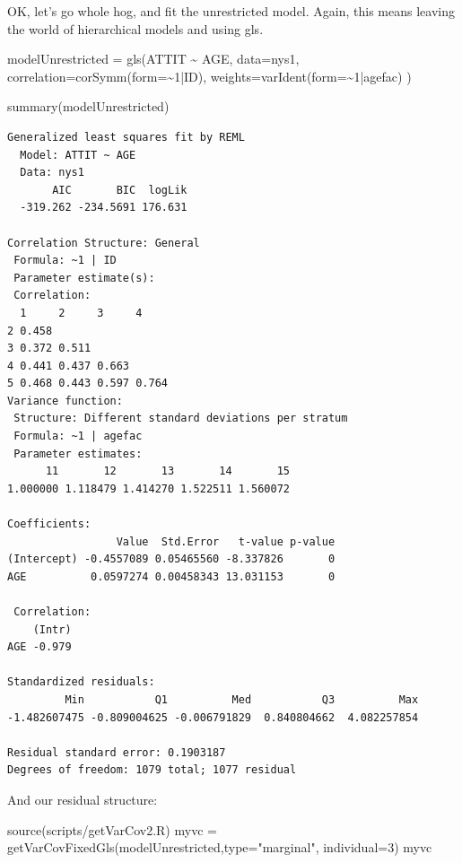 \documentclass[
  letterpaper,
  DIV=11,
  numbers=noendperiod]{scrreprt}
\newenvironment{Shaded}{\begin{snugshade}}{\end{snugshade}}
\newcommand{\AttributeTok}[1]{\textcolor[rgb]{0.49,0.56,0.16}{#1}}
\newcommand{\DecValTok}[1]{\textcolor[rgb]{0.25,0.63,0.44}{#1}}
\newcommand{\FunctionTok}[1]{\textcolor[rgb]{0.02,0.16,0.49}{#1}}
\newcommand{\NormalTok}[1]{\textcolor[rgb]{0.00,0.44,0.13}{#1}}
\newcommand{\OtherTok}[1]{\textcolor[rgb]{0.00,0.44,0.13}{#1}}
\newcommand{\SpecialCharTok}[1]{\textcolor[rgb]{0.25,0.44,0.63}{#1}}
\newcommand{\StringTok}[1]{\textcolor[rgb]{0.25,0.44,0.63}{#1}}
\begin{document}
OK, let's go whole hog, and fit the unrestricted model. Again, this
means leaving the world of hierarchical models and using gls.

\begin{Shaded}
\begin{Highlighting}[]
\NormalTok{modelUnrestricted }\OtherTok{=} \FunctionTok{gls}\NormalTok{(ATTIT }\SpecialCharTok{\textasciitilde{}}\NormalTok{ AGE, }
               \AttributeTok{data=}\NormalTok{nys1,}
               \AttributeTok{correlation=}\FunctionTok{corSymm}\NormalTok{(}\AttributeTok{form=}\SpecialCharTok{\textasciitilde{}}\DecValTok{1}\SpecialCharTok{|}\NormalTok{ID),}
               \AttributeTok{weights=}\FunctionTok{varIdent}\NormalTok{(}\AttributeTok{form=}\SpecialCharTok{\textasciitilde{}}\DecValTok{1}\SpecialCharTok{|}\NormalTok{agefac) )}


\FunctionTok{summary}\NormalTok{(modelUnrestricted)}
\end{Highlighting}
\end{Shaded}

\begin{verbatim}
Generalized least squares fit by REML
  Model: ATTIT ~ AGE 
  Data: nys1 
       AIC       BIC  logLik
  -319.262 -234.5691 176.631

Correlation Structure: General
 Formula: ~1 | ID 
 Parameter estimate(s):
 Correlation: 
  1     2     3     4    
2 0.458                  
3 0.372 0.511            
4 0.441 0.437 0.663      
5 0.468 0.443 0.597 0.764
Variance function:
 Structure: Different standard deviations per stratum
 Formula: ~1 | agefac 
 Parameter estimates:
      11       12       13       14       15 
1.000000 1.118479 1.414270 1.522511 1.560072 

Coefficients:
                 Value  Std.Error   t-value p-value
(Intercept) -0.4557089 0.05465560 -8.337826       0
AGE          0.0597274 0.00458343 13.031153       0

 Correlation: 
    (Intr)
AGE -0.979

Standardized residuals:
         Min           Q1          Med           Q3          Max 
-1.482607475 -0.809004625 -0.006791829  0.840804662  4.082257854 

Residual standard error: 0.1903187 
Degrees of freedom: 1079 total; 1077 residual
\end{verbatim}

And our residual structure:

\begin{Shaded}
\begin{Highlighting}[]
\FunctionTok{source}\NormalTok{(}\StringTok{\textquotesingle{}scripts/getVarCov2.R\textquotesingle{}}\NormalTok{)}
\NormalTok{myvc }\OtherTok{=} \FunctionTok{getVarCovFixedGls}\NormalTok{(modelUnrestricted,}\AttributeTok{type=}\StringTok{"marginal"}\NormalTok{, }\AttributeTok{individual=}\DecValTok{3}\NormalTok{)}
\NormalTok{myvc}
\end{Highlighting}
\end{Shaded}
\end{document}
